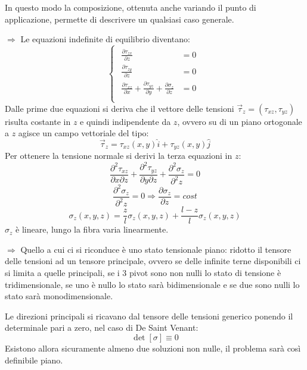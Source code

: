 \documentclass{article}
\begin{document}
\begin{adjustwidth}{2in}{}
	In questo modo la composizione, ottenuta anche variando il punto di applicazione,
	permette di descrivere un qualsiasi caso generale. \newline
	
\item[$\Rightarrow$] Le equazioni indefinite di equilibrio diventano: 
	\[ \begin{cases}
		\begin{aligned}
			\frac{\partial \tau_{zx}}{\partial z} & =0 \\
			
			\frac{\partial \tau_{zy}}{\partial z} & =0 \\
			
			\frac{\partial \tau_{xz}}{\partial x} + \frac{\partial \tau_{yz}}{\partial y} + \frac{\partial\sigma_z}{\partial z} & =0 \\
		\end{aligned}
	\end{cases}\]
	Dalle prime due equazioni si deriva che il vettore delle tensioni $\vec{\tau}_z=(\tau_{xz},\tau_{yz})$ risulta costante in $ z $ e quindi indipendente da $ z $, ovvero su di un piano ortogonale a $z$ agisce un campo vettoriale del tipo:
	\[ \vec{\tau}_z=\tau_{xz}(x,y)\hat{i} + \tau_{yz}(x,y)\hat{j} \]
	Per ottenere la tensione normale si derivi la terza equazioni in $z$:
	\[\frac{\partial^2 \tau_{xz}}{\partial x\partial z} + \frac{\partial^2 \tau_{yz}}{\partial y\partial z} + \frac{\partial^2\sigma_z}{\partial^2 z}  = 0 \]
	\[ \frac{\partial^2\sigma_z}{\partial^2 z}  = 0 \Rightarrow \frac{\partial\sigma_z}{\partial z}  = cost \]
	\[ \sigma_z (x,y,z)= \dfrac{z}{l}\sigma_z (x,y,z) + \dfrac{l-z}{l}\sigma_z (x,y,z)\]
	$\sigma_z$ è lineare, lungo la fibra varia linearmente. \newline


	\item[$\Rightarrow$] Quello a cui ci si riconduce è uno stato tensionale piano: ridotto il tensore delle tensioni ad un tensore principale, ovvero se delle infinite terne disponibili ci si limita a quelle principali, se i 3 pivot sono non nulli lo stato di tensione è tridimensionale, se uno è nullo lo stato sarà bidimensionale e se due sono nulli lo stato sarà monodimensionale. \newline 

	Le direzioni principali si ricavano dal tensore delle tensioni generico ponendo il determinale pari a zero, nel caso di De Saint Venant: 
	\[ \det[\sigma] \equiv 0 \]
	Esistono allora sicuramente almeno due soluzioni non nulle, il problema sarà così definibile piano.
	

\end{adjustwidth}
\end{document}
